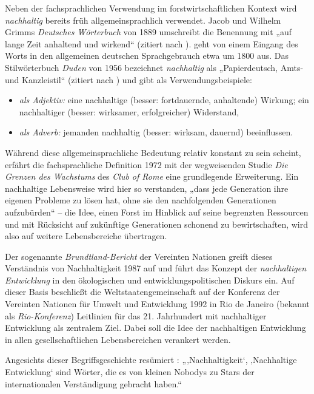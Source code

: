 \documentclass[
    german,
    a4paper,%
    12pt,%
    oneside,%
    toc=bibliography,
    final,
]{scrartcl}
\begin{document}
Neben der fachsprachlichen Verwendung im forstwirtschaftlichen Kontext wird \textit{nachhaltig} bereits früh allgemeinsprachlich verwendet. Jacob und Wilhelm Grimms \textit{Deutsches Wörterbuch} von 1889 umschreibt die Benennung mit „auf lange Zeit anhaltend und wirkend“ (zitiert nach \citealt[145]{Zürcher1965}). \citet[43]{Ninck1997} geht von einem Eingang des Worts in den allgemeinen deutschen Sprachgebrauch etwa um 1800 aus. Das Stilwörterbuch \textit{Duden} von 1956 bezeichnet \textit{nachhaltig} als „Papierdeutsch, Amts- und Kanzleistil“ (zitiert nach \citealt[145]{Zürcher1965}) und gibt als Verwendungsbeispiele:

\begin{itemize}
\item \textit{als Adjektiv:} eine nachhaltige (besser: fortdauernde, anhaltende) Wirkung; ein nachhaltiger (besser: wirksamer, erfolgreicher) Widerstand,
\item \textit{als Adverb:} jemanden nachhaltig (besser: wirksam, dauernd) beeinflussen.
\end{itemize}

Während diese allgemeinsprachliche Bedeutung relativ konstant zu sein scheint, erfährt die fachsprachliche Definition 1972 mit der wegweisenden Studie \textit{Die Grenzen des Wachstums} des \textit{Club of Rome} eine grundlegende Erweiterung. Ein nachhaltige Lebensweise wird hier so verstanden, „dass jede Generation ihre eigenen Probleme zu lösen hat, ohne sie den nachfolgenden Generationen aufzubürden“ \citep[8]{OhlmeierBrunold2015} – die Idee, einen Forst im Hinblick auf seine begrenzten Ressourcen und mit Rücksicht auf zukünftige Generationen schonend zu bewirtschaften, wird also auf weitere Lebensbereiche übertragen.

Der sogenannte \textit{Brundtland-Bericht} der Vereinten Nationen greift dieses Verständnis von Nachhaltigkeit 1987 auf und führt das Konzept der \textit{nachhaltigen Entwicklung} in den ökologischen und entwicklungspolitischen Diskurs ein. Auf dieser Basis beschließt die Weltstaatengemeinschaft auf der Konferenz der Vereinten Nationen für Umwelt und Entwicklung 1992 in Rio de Janeiro (bekannt als \textit{Rio-Konferenz}) Leitlinien für das 21. Jahrhundert mit nachhaltiger Entwicklung als zentralem Ziel. Dabei soll die Idee der nachhaltigen Entwicklung in allen gesellschaftlichen Lebensbereichen verankert werden.

Angesichts dieser Begriffsgeschichte resümiert \citet[10]{Ninck1997}: „‚Nachhaltigkeit‘, ‚Nachhaltige Entwicklung‘ sind Wörter, die es von kleinen Nobodys zu Stars der internationalen Verständigung gebracht haben.“
\end{document}
